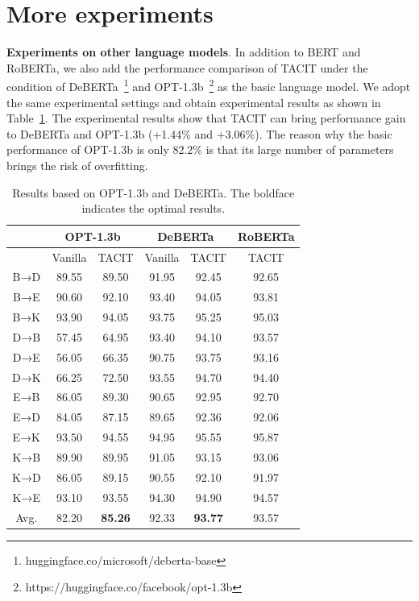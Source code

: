\documentclass[letterpaper]{article} %
\begin{document}
\section{More experiments} \label{app:b}
\textbf{Experiments on other language models}. In addition to BERT and RoBERTa, we also add the performance comparison of TACIT under the condition of DeBERTa~\cite{HeLGC21}\footnote{huggingface.co/microsoft/deberta-base} and OPT-1.3b~\cite{OPT}\footnote{https://huggingface.co/facebook/opt-1.3b} as the basic language model. We adopt the same experimental settings and obtain experimental results as shown in Table~\ref{tab:a1}. The experimental results show that TACIT can bring performance gain to DeBERTa and OPT-1.3b (+1.44\% and +3.06\%). The reason why the basic performance of OPT-1.3b is only 82.2\% is that its large number of parameters brings the risk of overfitting. 
\begin{table}[htbp]
	\renewcommand{\arraystretch}{0.9}
	\setlength\tabcolsep{1.3mm}
	\centering
	\begin{tabular}{ccc|cc|c} \hline \hline
		& \multicolumn{2}{c}{OPT-1.3b} & \multicolumn{2}{c}{DeBERTa} & \multicolumn{1}{c}{RoBERTa} \\ \hline
		& \multicolumn{1}{l}{Vanilla} & \multicolumn{1}{l}{TACIT} & Vanilla & TACIT & \multicolumn{1}{c}{TACIT} \\ \hline
		B→D   & 89.55 & 89.50 & 91.95 & 92.45 & 92.65 \\
		B→E   & 90.60  & 92.10 & 93.40 & 94.05 & 93.81 \\
		B→K   & 93.90 & 94.05 & 93.75 & 95.25 & 95.03 \\
		D→B   & 57.45 & 64.95 & 93.40 & 94.10 & 93.57 \\
		D→E   & 56.05 & 66.35 & 90.75 & 93.75 & 93.16 \\
		D→K   & 66.25 & 72.50 & 93.55 & 94.70 & 94.40 \\
		E→B   & 86.05 & 89.30 & 90.65 & 92.95 & 92.70 \\
		E→D   & 84.05 & 87.15 & 89.65 & 92.36 & 92.06 \\
		E→K   & 93.50 & 94.55 & 94.95 & 95.55 & 95.87 \\
		K→B   & 89.90 & 89.95 & 91.05 & 93.15 & 93.06 \\
		K→D   & 86.05 & 89.15 & 90.55 & 92.10 & 91.97 \\
		K→E   & 93.10 & 93.55 & 94.30 & 94.90 & 94.57 \\ \hline
		Avg.  & 82.20 & \textbf{85.26} & 92.33 & \textbf{93.77} & 93.57 \\
		\hline \hline
	\end{tabular}%
	\caption{Results based on OPT-1.3b and DeBERTa. The boldface indicates the optimal
		results.}
	\label{tab:a1}%
\end{table}%
\end{document}
